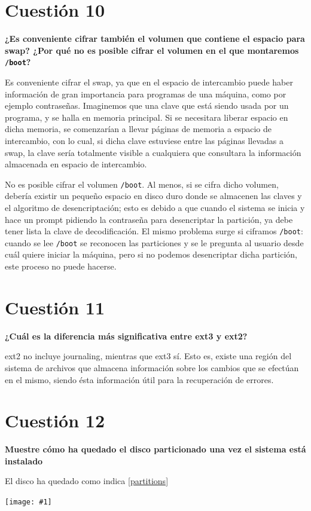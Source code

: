 \documentclass[a4paper,11pt]{article}
\newenvironment{answer}{%
\begin{list}{}{%
}%
\item[]}{\end{list}}
\newcommand{\imagen}[4]{
  \begin{minipage}{\linewidth}
    \centering
    \texttt{[image: \#1]}
    \captionof{figure}{#2}
    \label{#3}
  \end{minipage} 
}
\begin{document}
\section{Cuestión 10}
\textbf{¿Es conveniente cifrar también el volumen que contiene el espacio para swap? ¿Por qué no es posible cifrar 
el volumen en el que montaremos \texttt{/boot}?}
\begin{answer}
 Es conveniente cifrar el swap, ya que en el espacio de intercambio puede haber información de gran importancia para
 programas de una máquina, como por ejemplo contraseñas. Imaginemos que una clave que está siendo usada por un programa,
 y se halla en memoria principal. Si se necesitara liberar espacio en dicha memoria, se comenzarían a llevar páginas
 de memoria a espacio de intercambio, con lo cual, si dicha clave estuviese entre las páginas llevadas a swap, la clave
 sería totalmente visible a cualquiera que consultara la información almacenada en espacio de intercambio.
 
 \cite{boot} No es posible cifrar el volumen \texttt{/boot}. Al menos, si se cifra dicho volumen, debería existir un pequeño espacio
 en disco duro donde se almacenen las claves y el algoritmo de desencriptación; esto es debido a que cuando el sistema
 se inicia y hace un prompt pidiendo la contraseña para desencriptar la partición, ya debe tener lista la clave de
 decodificación. El mismo problema surge si ciframos \texttt{/boot}: cuando se lee \texttt{/boot} se reconocen las particiones
 y se le pregunta al usuario desde cuál quiere iniciar la máquina, pero si no podemos desencriptar dicha partición, este
 proceso no puede hacerse.
 
\end{answer}

\section{Cuestión 11}
\textbf{¿Cuál es la diferencia más significativa entre ext3 y ext2?}
\begin{answer}
 ext2 no incluye journaling, mientras que ext3 sí. Esto es, existe una región del sistema de archivos que almacena
 información sobre los cambios que se efectúan en el mismo, siendo ésta información útil para la recuperación de errores.
 \cite{ext}
\end{answer}

\section{Cuestión 12}
\textbf{Muestre cómo ha quedado el disco particionado una vez el sistema está instalado}
\begin{answer}
 El disco ha quedado como indica \ref{partitions}
 
 \imagen{./images/lsblk.png}{Particiones en Ubuntu Server}{partitions}{1}
\end{answer}
\end{document}
